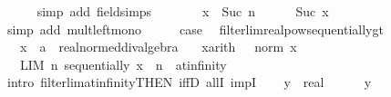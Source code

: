 \begin{isabellebody}
\ \ \ \ \isamarkupfalse%
\ {\isacharparenleft}{\kern0pt}simp\ add{\isacharcolon}{\kern0pt}\ field{\isacharunderscore}{\kern0pt}simps{\isacharparenright}{\kern0pt}\isanewline
\ \ \isamarkupfalse%
\ \isamarkupfalse%
\ {\isachardoublequoteopen}{\isasymdots}\ {\isasymle}\ {\isacharparenleft}{\kern0pt}x\ {\isacharplus}{\kern0pt}\ {}{\isacharparenright}{\kern0pt}{\isacharcircum}{\kern0pt}Suc\ n{\isachardoublequoteclose}\isanewline
\ \ \ \ \isamarkupfalse%
\ Suc\ x\ \isamarkupfalse%
\ {\isacharparenleft}{\kern0pt}simp\ add{\isacharcolon}{\kern0pt}\ mult{\isacharunderscore}{\kern0pt}left{\isacharunderscore}{\kern0pt}mono{\isacharparenright}{\kern0pt}\isanewline
\ \ \isamarkupfalse%
\ \isamarkupfalse%
\ {\isacharquery}{\kern0pt}case\ \isacommand{{\isachardot}{\kern0pt}}\isamarkupfalse%
\isanewline
{}\isamarkupfalse%
%
\endisatagproof
{\isafoldproof}%
%
\isadelimproof
\isanewline
%
\endisadelimproof
\isanewline
{}\isamarkupfalse%
\ filterlim{\isacharunderscore}{\kern0pt}realpow{\isacharunderscore}{\kern0pt}sequentially{\isacharunderscore}{\kern0pt}gt{}{\isacharcolon}{\kern0pt}\isanewline
\ \ \ x\ {\isacharcolon}{\kern0pt}{\isacharcolon}{\kern0pt}\ {\isachardoublequoteopen}{\isacharprime}{\kern0pt}a\ {\isacharcolon}{\kern0pt}{\isacharcolon}{\kern0pt}\ real{\isacharunderscore}{\kern0pt}normed{\isacharunderscore}{\kern0pt}div{\isacharunderscore}{\kern0pt}algebra{\isachardoublequoteclose}\isanewline
\ \ \ x{\isacharbrackleft}{\kern0pt}arith{\isacharbrackright}{\kern0pt}{\isacharcolon}{\kern0pt}\ {\isachardoublequoteopen}{}\ {\isacharless}{\kern0pt}\ norm\ x{\isachardoublequoteclose}\isanewline
\ \ \ {\isachardoublequoteopen}LIM\ n\ sequentially{\isachardot}{\kern0pt}\ x\ {\isacharcircum}{\kern0pt}\ n\ {\isacharcolon}{\kern0pt}{\isachargreater}{\kern0pt}\ at{\isacharunderscore}{\kern0pt}infinity{\isachardoublequoteclose}\isanewline
%
\isadelimproof
%
\endisadelimproof
%
\isatagproof
{}\isamarkupfalse%
\ {\isacharparenleft}{\kern0pt}intro\ filterlim{\isacharunderscore}{\kern0pt}at{\isacharunderscore}{\kern0pt}infinity{\isacharbrackleft}{\kern0pt}THEN\ iffD{}{\isacharbrackright}{\kern0pt}\ allI\ impI{\isacharparenright}{\kern0pt}\isanewline
\ \ \isamarkupfalse%
\ y\ {\isacharcolon}{\kern0pt}{\isacharcolon}{\kern0pt}\ real\isanewline
\ \ \isamarkupfalse%
\ {\isachardoublequoteopen}{}\ {\isacharless}{\kern0pt}\ y{\isachardoublequoteclose}\isanewline

\end{isabellebody}
